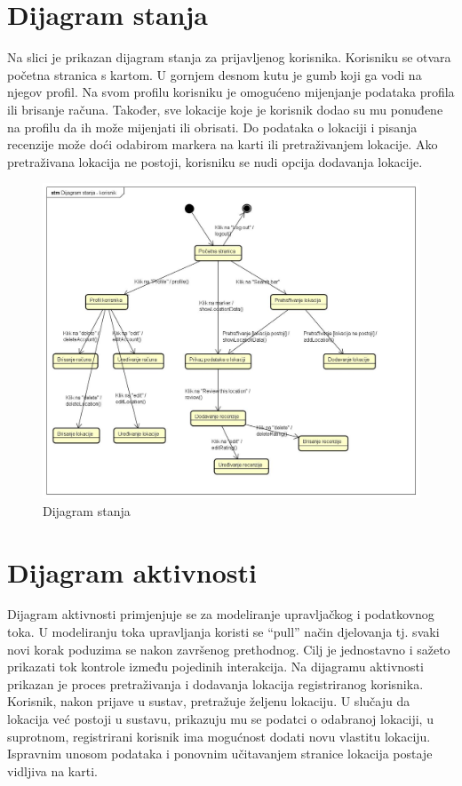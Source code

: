     \eject
    \section{Dijagram stanja}

        Na slici je prikazan dijagram stanja za prijavljenog korisnika. Korisniku se otvara početna stranica s kartom. U gornjem desnom kutu je gumb koji ga vodi na njegov profil. Na svom profilu korisniku je omogućeno mijenjanje podataka profila ili brisanje računa. Također, sve lokacije koje je korisnik dodao su mu ponuđene na profilu da ih može mijenjati ili obrisati. Do podataka o lokaciji i pisanja recenzije može doći odabirom markera na karti ili pretraživanjem lokacije. Ako pretraživana lokacija ne postoji, korisniku se nudi opcija dodavanja lokacije.

        \begin{figure}[H]
        	\includegraphics[width=\textwidth]{img/Dijagram stanja - korisnik.jpg}
        	\centering
        	\caption{Dijagram stanja}
        	\label{fig:promjene}
        \end{figure}

        \newpage 
    
    \section{Dijagram aktivnosti}
        Dijagram aktivnosti primjenjuje se za modeliranje upravljačkog i podatkovnog toka. U modeliranju toka upravljanja koristi se “pull” način djelovanja tj. svaki novi korak poduzima se nakon završenog prethodnog. Cilj je jednostavno i sažeto prikazati tok kontrole između pojedinih interakcija. Na dijagramu aktivnosti prikazan je proces pretraživanja i dodavanja lokacija registriranog korisnika. Korisnik, nakon prijave u sustav, pretražuje željenu lokaciju. U slučaju da lokacija već postoji u sustavu, prikazuju mu se podatci o odabranoj lokaciji, u suprotnom, registrirani korisnik ima mogućnost dodati novu vlastitu lokaciju. Ispravnim unosom podataka i ponovnim učitavanjem stranice lokacija postaje vidljiva na karti. 


